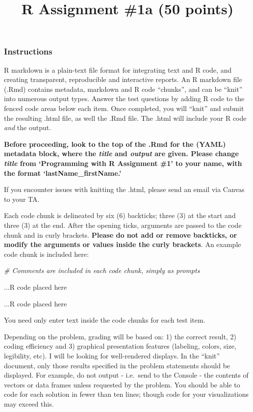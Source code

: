 \documentclass[
]{article}
\title{R Assignment \#1a (50 points)}
\author{}
\date{\vspace{-2.5em}}
\newenvironment{Shaded}{\begin{snugshade}}{\end{snugshade}}
\newcommand{\CommentTok}[1]{\textcolor[rgb]{0.56,0.35,0.01}{\textit{#1}}}
\newcommand{\NormalTok}[1]{#1}
\begin{document}
\maketitle

\hypertarget{instructions}{%
\subsubsection{Instructions}\label{instructions}}

R markdown is a plain-text file format for integrating text and R code,
and creating transparent, reproducible and interactive reports. An R
markdown file (.Rmd) contains metadata, markdown and R code ``chunks'',
and can be ``knit'' into numerous output types. Answer the test
questions by adding R code to the fenced code areas below each item.
Once completed, you will ``knit'' and submit the resulting .html file,
as well the .Rmd file. The .html will include your R code \emph{and} the
output.

\textbf{Before proceeding, look to the top of the .Rmd for the (YAML)
metadata block, where the \emph{title} and \emph{output} are given.
Please change \emph{title} from `Programming with R Assignment \#1' to
your name, with the format `lastName\_firstName.'}

If you encounter issues with knitting the .html, please send an email
via Canvas to your TA.

Each code chunk is delineated by six (6) backticks; three (3) at the
start and three (3) at the end. After the opening ticks, arguments are
passed to the code chunk and in curly brackets. \textbf{Please do not
add or remove backticks, or modify the arguments or values inside the
curly brackets}. An example code chunk is included here:

\begin{Shaded}
\begin{Highlighting}[]
\CommentTok{\# Comments are included in each code chunk, simply as prompts}

\NormalTok{...R code placed here}

\NormalTok{...R code placed here}
\end{Highlighting}
\end{Shaded}

You need only enter text inside the code chunks for each test item.

Depending on the problem, grading will be based on: 1) the correct
result, 2) coding efficiency and 3) graphical presentation features
(labeling, colors, size, legibility, etc). I will be looking for
well-rendered displays. In the ``knit'' document, only those results
specified in the problem statements should be displayed. For example, do
not output - i.e.~send to the Console - the contents of vectors or data
frames unless requested by the problem. You should be able to code for
each solution in fewer than ten lines; though code for your
visualizations may exceed this.
\end{document}
